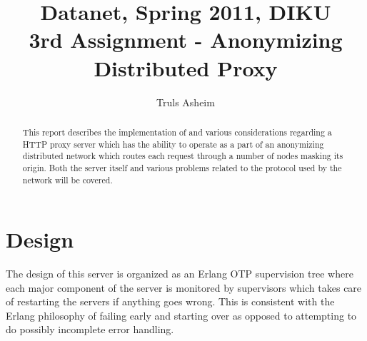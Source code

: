 \documentclass{sig-alternate}
\begin{document}


\title{Datanet, Spring 2011, DIKU\\3rd Assignment - Anonymizing
  Distributed Proxy}


\author{
\alignauthor
Truls Asheim\\
}

\maketitle

\begin{abstract}

%
%
  This report describes the implementation of and various
  considerations regarding a HTTP proxy server which has the ability
  to operate as a part of an anonymizing distributed network which
  routes each request through a number of nodes masking its
  origin. Both the server itself and various problems related to the
  protocol used by the network will be covered.

\end{abstract}

%
%

\section{Design}
The design of this server is organized as an Erlang OTP supervision
tree where each major component of the server is monitored by
supervisors which takes care of restarting the servers if anything
goes wrong. This is consistent with the Erlang philosophy of failing
early and starting over as opposed to attempting to do possibly
incomplete error handling.
\end{document}

